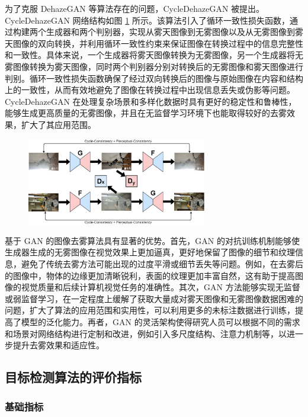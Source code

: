 为了克服 DehazeGAN 等算法存在的问题，CycleDehazeGAN 被提出\cite{cgan}。CycleDehazeGAN 网络结构如图 \ref{fig:cycledehaze} 所示。该算法引入了循环一致性损失函数，通过构建两个生成器和两个判别器，实现从雾天图像到无雾图像以及从无雾图像到雾天图像的双向转换，并利用循环一致性约束来保证图像在转换过程中的信息完整性和一致性。具体来说，一个生成器将雾天图像转换为无雾图像，另一个生成器将无雾图像转换为雾天图像，同时两个判别器分别对转换后的无雾图像和雾天图像进行判别。循环一致性损失函数确保了经过双向转换后的图像与原始图像在内容和结构上的一致性，从而有效地避免了图像在转换过程中出现信息丢失或伪影等问题。CycleDehazeGAN 在处理复杂场景和多样化数据时具有更好的稳定性和鲁棒性，能够生成更高质量的无雾图像，并且在无监督学习环境下也能取得较好的去雾效果，扩大了其应用范围。

\begin{figure}[ht]
    \centering
    \includegraphics[width=0.7\textwidth]{../figure/Cycle-Dehaze.png}
    \captionsetup{font=footnotesize}
    \label{fig:cycledehaze}
\end{figure}

基于 GAN 的图像去雾算法具有显著的优势。首先，GAN 的对抗训练机制能够使生成器生成的无雾图像在视觉效果上更加逼真，更好地保留了图像的细节和纹理信息，避免了传统去雾方法可能出现的过度平滑或细节丢失等问题。例如，在去雾后的图像中，物体的边缘更加清晰锐利，表面的纹理更加丰富自然，这有助于提高图像的视觉质量和后续计算机视觉任务的准确性。其次，GAN 方法能够实现无监督或弱监督学习，在一定程度上缓解了获取大量成对雾天图像和无雾图像数据困难的问题，扩大了算法的应用范围和实用性，可以利用更多的未标注数据进行训练，提高了模型的泛化能力。再者，GAN 的灵活架构使得研究人员可以根据不同的需求和场景对网络结构进行定制和改进，例如引入多尺度结构、注意力机制等，以进一步提升去雾效果和适应性。


\subsection{目标检测算法的评价指标}

\subsubsection{基础指标}

